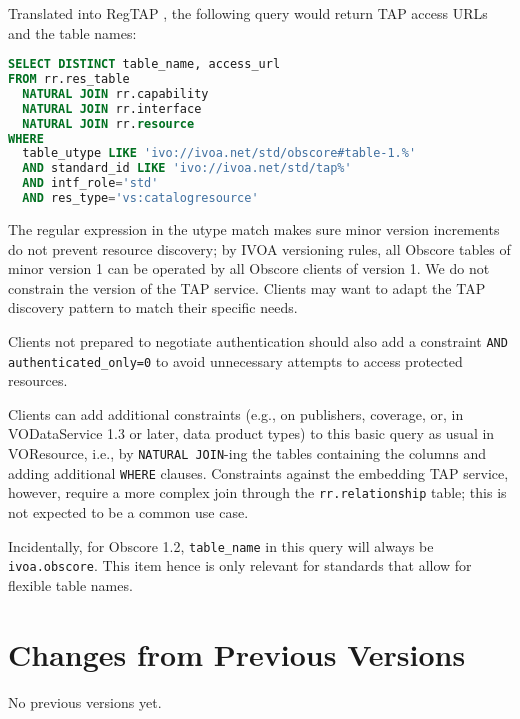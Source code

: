 \documentclass[11pt,a4paper]{ivoa}
\begin{document}
Translated into RegTAP \citep{2019ivoa.spec.1011D}, the following query
would return TAP access URLs and the table names:

\begin{lstlisting}[language=SQL]
SELECT DISTINCT table_name, access_url
FROM rr.res_table
  NATURAL JOIN rr.capability
  NATURAL JOIN rr.interface
  NATURAL JOIN rr.resource
WHERE
  table_utype LIKE 'ivo://ivoa.net/std/obscore#table-1.%'
  AND standard_id LIKE 'ivo://ivoa.net/std/tap%'
  AND intf_role='std'
  AND res_type='vs:catalogresource'
\end{lstlisting}

The regular expression in the utype match makes sure minor version
increments do not prevent resource discovery; by IVOA versioning rules,
all Obscore tables of minor version 1 can be operated by all Obscore
clients of version 1.  We do not constrain the version of the TAP
service. Clients may want to adapt the TAP discovery pattern to match
their specific needs.

Clients not prepared to negotiate authentication should also add a
constraint \verb|AND authenticated_only=0| to avoid unnecessary attempts
to access protected resources.

Clients can add additional constraints (e.g., on publishers, coverage,
or, in VODataService 1.3 or later, data product types) to this basic
query as usual in VOResource, i.e., by \verb|NATURAL JOIN|-ing the
tables containing the columns and adding additional \verb|WHERE|
clauses.  Constraints against the embedding TAP service, however,
require a more complex join through the \verb|rr.relationship| table;
this is not expected to be a common use case.

Incidentally, for Obscore 1.2, \verb|table_name| in this query will always be
\verb|ivoa.obscore|.  This item hence is only relevant for standards
that allow for flexible table names.

\appendix
\section{Changes from Previous Versions}

No previous versions yet.



\end{document}
